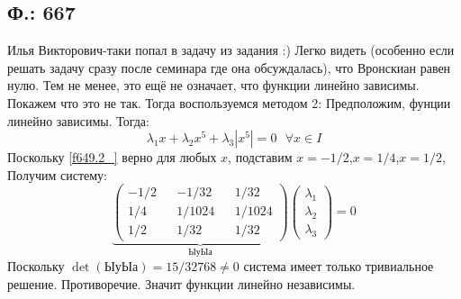 \documentclass{article}
\begin{document}
\subsection{Ф.: 667}
Илья Викторович-таки попал в задачу из задания :)
Легко видеть (особенно если решать задачу сразу после семинара где она обсуждалась), что Вронскиан равен нулю. Тем не менее, это ещё не означает, что функции линейно зависимы. Покажем что это не так. Тогда воспользуемся методом 2:
Предположим, фунции линейно зависимы. Тогда:
\begin{equation}\label{f649.2_}
    \lambda_1 x + \lambda_2 x^5 + \lambda_3 |{x^5}| = 0 \text{ } \forall x \in I
\end{equation}
Поскольку \ref{f649.2_} верно для любых $x$, подставим $x=-1/2$,$x=1/4$,$x=1/2$, Получим систему:
\begin{equation}
    \underbrace{
    \begin{pmatrix}
    -1/2 && -1/32 && 1/32\\
    1/4 && 1/1024 && 1/1024\\
    1/2 && 1/32 && 1/32
    \end{pmatrix}}_{\text{ЫуЫа}}
    \begin{pmatrix}
    \lambda_1\\
    \lambda_2\\
    \lambda_3
    \end{pmatrix}
    =0
\end{equation}
 Поскольку $\det(\text{ЫуЫа})=15/32768 \neq 0$ система имеет только тривиальное решение. Противоречие. Значит функции линейно независимы.
\end{document}
